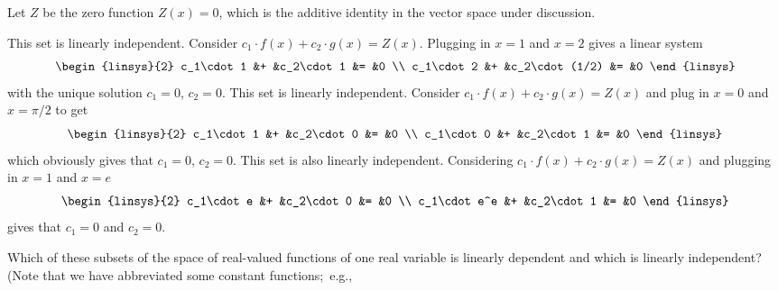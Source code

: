 \begin{exercises}
    \begin{answer}
      Let $Z$ be the zero function $Z(x)=0$, which is the additive identity in
      the vector space under discussion.
      \begin{exparts}
        \partsitem This set is linearly independent.  
          Consider \( c_1\cdot f(x)+c_2\cdot g(x)=Z(x) \).
          Plugging in \( x=1 \) and \( x=2 \) gives a linear system 
          \begin{equation*}
            \begin{linsys}{2}
              c_1\cdot 1  &+  &c_2\cdot 1     &=  &0  \\
              c_1\cdot 2  &+  &c_2\cdot (1/2) &=  &0
            \end{linsys}
          \end{equation*}
          with the unique solution \( c_1=0 \), \( c_2=0 \).
        \partsitem This set is linearly independent.  
          Consider \( c_1\cdot f(x)+c_2\cdot g(x)=Z(x) \) and 
          plug in \( x=0 \) and \( x=\pi/2 \) to get 
          \begin{equation*}
            \begin{linsys}{2}
              c_1\cdot 1  &+  &c_2\cdot 0     &=  &0  \\
              c_1\cdot 0  &+  &c_2\cdot 1     &=  &0
            \end{linsys}
          \end{equation*}
          which obviously gives that \( c_1=0 \), \( c_2=0 \).
        \partsitem This set is also linearly independent.  
          Considering \( c_1\cdot f(x)+c_2\cdot g(x)=Z(x) \) and 
          plugging in \( x=1 \) and \( x=e \) 
          \begin{equation*}
            \begin{linsys}{2}
              c_1\cdot e    &+  &c_2\cdot 0     &=  &0  \\
              c_1\cdot e^e  &+  &c_2\cdot 1     &=  &0
            \end{linsys}
          \end{equation*}
          gives that \( c_1=0 \) and \( c_2=0 \).
      \end{exparts}  
     \end{answer}
  \recommended \item 
    Which of these subsets of the space of real-valued functions
    of one real variable is linearly dependent and which is linearly
    independent?
    (Note that we have abbreviated some constant functions;~e.g., 

\end{exercises}

